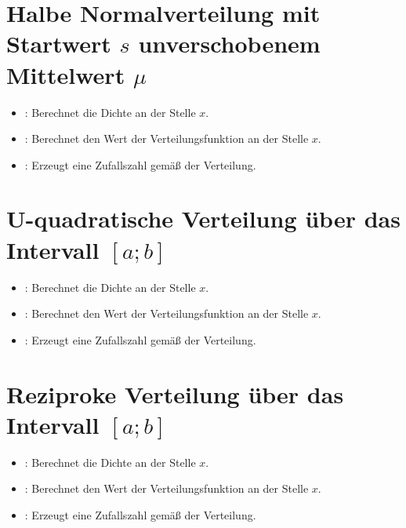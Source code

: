\section{Halbe Normalverteilung mit Startwert \texorpdfstring{$s$}{s} unverschobenem Mittelwert \texorpdfstring{$\mu$}{mu}}

\begin{itemize}

\item
{}:
Berechnet die Dichte an der Stelle $x$.

\item
{}:
Berechnet den Wert der Verteilungsfunktion an der Stelle $x$.

\item
{}:
Erzeugt eine Zufallszahl gemäß der Verteilung.

\end{itemize}



\section{U-quadratische Verteilung über das Intervall \texorpdfstring{$[a;b]$}{[a;b]}}

\begin{itemize}

\item
{}:
Berechnet die Dichte an der Stelle $x$.

\item
{}:
Berechnet den Wert der Verteilungsfunktion an der Stelle $x$.

\item
{}:
Erzeugt eine Zufallszahl gemäß der Verteilung.

\end{itemize}



\section{Reziproke Verteilung über das Intervall \texorpdfstring{$[a;b]$}{[a;b]}}

\begin{itemize}

\item
{}:
Berechnet die Dichte an der Stelle $x$.

\item
{}:
Berechnet den Wert der Verteilungsfunktion an der Stelle $x$.

\item
{}:
Erzeugt eine Zufallszahl gemäß der Verteilung.

\end{itemize}



